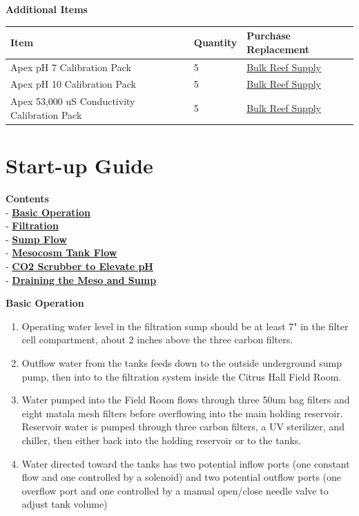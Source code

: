 \documentclass[]{book}
\providecommand{\tightlist}{%
  \setlength{\itemsep}{0pt}\setlength{\parskip}{0pt}}
\begin{document}
 \textbf{Additional Items}

\begin{longtable}[]{@{}lll@{}}
\toprule
Item & Quantity & Purchase Replacement\tabularnewline
\midrule
\endhead
Apex pH 7 Calibration Pack & 5 &
\href{https://www.bulkreefsupply.com/probe-calibration-kit-ph-7-0-ph-10-0-salinity-53000us-neptune-systems.html}{Bulk
Reef Supply}\tabularnewline
Apex pH 10 Calibration Pack & 5 &
\href{https://www.bulkreefsupply.com/probe-calibration-kit-ph-7-0-ph-10-0-salinity-53000us-neptune-systems.html}{Bulk
Reef Supply}\tabularnewline
Apex 53,000 uS Conductivity Calibration Pack & 5 &
\href{https://www.bulkreefsupply.com/probe-calibration-kit-ph-7-0-ph-10-0-salinity-53000us-neptune-systems.html}{Bulk
Reef Supply}\tabularnewline
\bottomrule
\end{longtable}

\chapter{Start-up Guide}\label{start-up-guide}

\textbf{Contents}\\
- \protect\hyperlink{Basic_Operation}{\textbf{Basic Operation}}\\
- \protect\hyperlink{Filtration}{\textbf{Filtration}}\\
- \protect\hyperlink{Sump_Flow}{\textbf{Sump Flow}}\\
- \protect\hyperlink{Meso_Flow}{\textbf{Mesocosm Tank Flow}}\\
- \protect\hyperlink{CO2_Scrubber}{\textbf{CO2 Scrubber to Elevate
pH}}\\
- \protect\hyperlink{Draining_Sump}{\textbf{Draining the Meso and Sump}}

 \textbf{Basic Operation}

\begin{enumerate}
\def\labelenumi{\arabic{enumi}.}
\tightlist
\item
  Operating water level in the filtration sump should be at least 7" in
  the filter cell compartment, about 2 inches above the three carbon
  filters.
\item
  Outflow water from the tanks feeds down to the outside underground
  sump pump, then into to the filtration system inside the Citrus Hall
  Field Room.
\item
  Water pumped into the Field Room flows through three 50um bag filters
  and eight matala mesh filters before overflowing into the main holding
  reservoir. Reservoir water is pumped through three carbon filters, a
  UV sterilizer, and chiller, then either back into the holding
  reservoir or to the tanks.
\item
  Water directed toward the tanks has two potential inflow ports (one
  constant flow and one controlled by a solenoid) and two potential
  outflow ports (one overflow port and one controlled by a manual
  open/close needle valve to adjust tank volume)
\end{enumerate}
\end{document}

